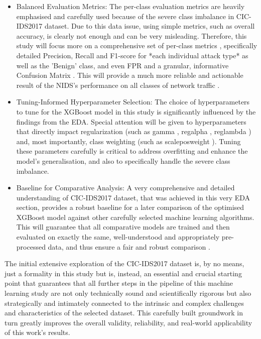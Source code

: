 \begin{itemize}[noitemsep]
\item Balanced Evaluation Metrics: The per-class evaluation metrics are heavily emphasised and carefully used because of the severe class imbalance in CIC-IDS2017 dataset. Due to this data issue, using simple metrics, such as overall accuracy, is clearly not enough and can be very misleading. Therefore, this study will focus more on a comprehensive set of per-class metrics , specifically detailed Precision, Recall and F1-score for *each individual attack type* as well as the 'Benign' class, and even FPR and a granular, informative Confusion Matrix . This will provide a much more reliable and actionable result of the NIDS's performance on all classes of network traffic \parencite{al2022cicids}.
\item Tuning-Informed Hyperparameter Selection: The choice of hyperparameters to tune for the XGBoost model in this study is significantly influenced by the findings from the EDA. Special attention will be given to hyperparameters that directly impact regularization (such as gamma , reg\textunderscore alpha , reg\textunderscore lambda ) and, most importantly, class weighting (such as scale\textunderscore pos\textunderscore weight ). Tuning these parameters carefully is critical to address overfitting and enhance the model's generalisation, and also to specifically handle the severe class imbalance.
\item Baseline for Comparative Analysis: A very comprehensive and detailed understanding of CIC-IDS2017 dataset, that was achieved in this very EDA section, provides a robust baseline for a later comparison of the optimised XGBoost model against other carefully selected machine learning algorithms. This will guarantee that all comparative models are trained and then evaluated on exactly the same, well-understood and appropriately pre-processed data, and thus ensure a fair and robust comparison \parencite{shafi2022comprehensive}.
\end{itemize} 
The initial extensive exploration of the CIC-IDS2017 dataset is, by no means, just a formality in this study but is, instead, an essential and crucial starting point that guarantees that all further steps in the pipeline of this machine learning study are not only technically sound and scientifically rigorous but also strategically and intimately connected to the intrinsic and complex challenges and characteristics of the selected dataset. This carefully built groundwork in turn greatly improves the overall validity, reliability, and real-world applicability of this work's results.

